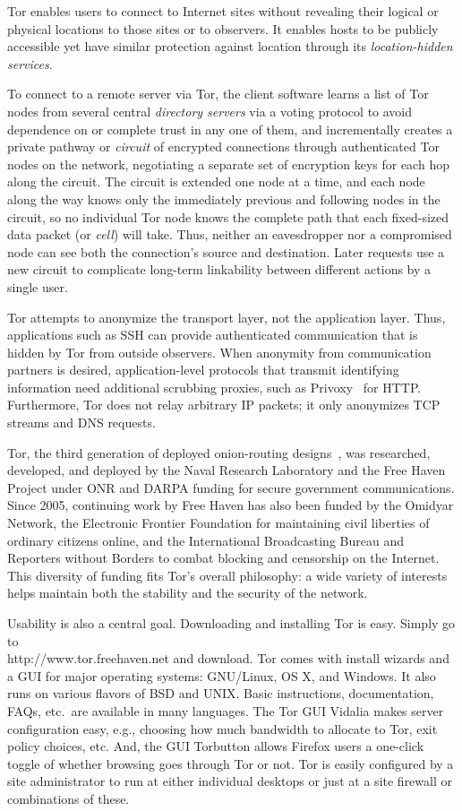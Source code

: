 \documentclass{llncs}
\begin{document}
Tor enables users to connect to Internet sites without revealing their
logical or physical locations to those sites or to observers.  It
enables hosts to be publicly accessible yet have similar protection
against location through its \emph{location-hidden services}.

To connect to a remote server via Tor, the client software learns
a %
list of Tor nodes from several central \emph{directory servers} via a
voting protocol to avoid dependence on or complete trust in any one of
them, and incrementally creates a private pathway or \emph{circuit} of
encrypted connections through authenticated Tor nodes on the network,
negotiating a separate set of encryption keys for each hop along the
circuit.  The circuit is extended one node at a time, and each node
along the way knows only the immediately previous and following nodes
in the circuit, so no individual Tor node knows the complete path that
each fixed-sized data packet (or \emph{cell}) will take.  Thus,
neither an eavesdropper nor a compromised node can see both the
connection's source and destination.  Later requests use a new
circuit to complicate long-term linkability between different actions
by a single user.

Tor attempts to anonymize the transport layer, not the application
layer.  Thus, applications such as SSH can provide
authenticated communication that is hidden by Tor from outside observers.
When anonymity from communication partners is desired,
application-level protocols that transmit identifying
information need additional scrubbing proxies, such as
Privoxy~\cite{privoxy} for HTTP\@.  Furthermore, Tor does not relay
arbitrary IP packets; it only anonymizes TCP streams and DNS requests.

Tor, the third generation of deployed onion-routing
designs~\cite{or-ih96,or-jsac98,tor-design}, was researched, developed,
and deployed by the Naval Research Laboratory and the Free Haven
Project under ONR and DARPA funding for secure government
communications.  Since 2005, continuing work by Free Haven has also
been funded by the Omidyar Network, the Electronic Frontier Foundation
for maintaining civil liberties of ordinary citizens online, and the
International Broadcasting Bureau and Reporters without Borders to
combat blocking and censorship on the Internet. This diversity of
funding fits Tor's overall philosophy: a wide variety of interests
helps maintain both the stability and the security of the network.

Usability is also a central goal. Downloading and installing Tor is
easy. Simply go to\\
http://www.tor.freehaven.net and download.  Tor comes with install
wizards and a GUI for major operating systems: GNU/Linux, OS X, and
Windows. It also runs on various flavors of BSD and UNIX\@. Basic
instructions, documentation, FAQs, etc.\ are available in many
languages. The Tor GUI Vidalia makes server configuration easy, e.g.,
choosing how much bandwidth to allocate to Tor, exit policy choices,
etc. And, the GUI Torbutton allows Firefox users a one-click toggle of
whether browsing goes through Tor or not.  Tor is easily configured by
a site administrator to run at either individual desktops or just at a
site firewall or combinations of these.
\end{document}
